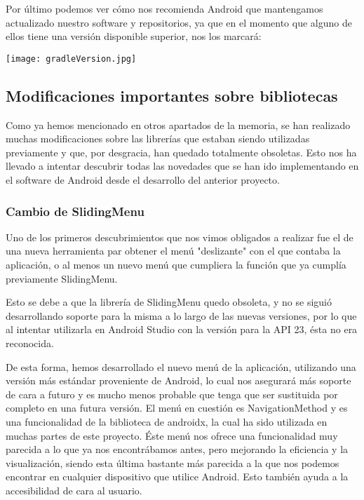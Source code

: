 Por último podemos ver cómo nos recomienda Android que mantengamos actualizado nuestro software y repositorios, ya que en el momento que alguno de ellos tiene una versión disponible superior, nos los marcará:

\texttt{[image: gradleVersion.jpg]}

\subsection{Modificaciones importantes sobre bibliotecas}

Como ya hemos mencionado en otros apartados de la memoria, se han realizado muchas modificaciones sobre las librerías que estaban siendo utilizadas previamente y que, por desgracia, han quedado totalmente obsoletas. Esto nos ha llevado a intentar descubrir todas las novedades que se han ido implementando en el software de Android desde el desarrollo del anterior proyecto.

\subsubsection{Cambio de SlidingMenu}

Uno de los primeros descubrimientos que nos vimos obligados a realizar fue el de una nueva herramienta par obtener el menú "deslizante" con el que contaba la aplicación, o al menos un nuevo menú que cumpliera la función que ya cumplía previamente SlidingMenu.

Esto se debe a que la librería de SlidingMenu quedo obsoleta, y no se siguió desarrollando soporte para la misma a lo largo de las nuevas versiones, por lo que al intentar utilizarla en Android Studio con la versión para la API 23, ésta no era reconocida.

De esta forma, hemos desarrollado el nuevo menú de la aplicación, utilizando una versión más estándar proveniente de Android, lo cual nos asegurará más soporte de cara a futuro y es mucho menos probable que tenga que ser sustituida por completo en una futura versión. El menú en cuestión es NavigationMethod y es una funcionalidad de la biblioteca de androidx, la cual ha sido utilizada en muchas partes de este proyecto. Éste menú nos ofrece una funcionalidad muy parecida a lo que ya nos encontrábamos antes, pero mejorando la eficiencia y la visualización, siendo esta última bastante más parecida a la que nos podemos encontrar en cualquier dispositivo que utilice Android. Esto también ayuda a la accesibilidad de cara al usuario.

